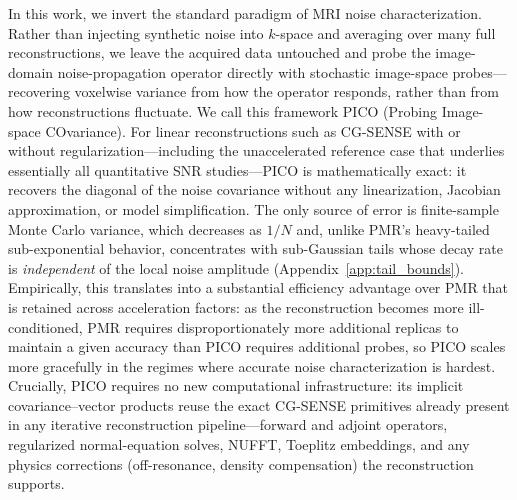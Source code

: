 \documentclass[AMA,STIX2COL,Linenumberson]{MRM}
\begin{document}
In this work, we invert the standard paradigm of MRI 
noise characterization. Rather than injecting synthetic 
noise into $k$-space and averaging over many full 
reconstructions, we leave the acquired data untouched 
and probe the image-domain noise-propagation operator 
directly with stochastic image-space probes---recovering 
voxelwise variance from how the operator responds, 
rather than from how reconstructions fluctuate. We call 
this framework PICO (Probing Image-space COvariance). 
For linear reconstructions such as CG-SENSE with or 
without regularization---including the unaccelerated 
reference case that underlies essentially all 
quantitative SNR studies---PICO is mathematically exact: 
it recovers the diagonal of the noise covariance 
without any linearization, Jacobian approximation, or 
model simplification. The only source of error is 
finite-sample Monte Carlo variance, which decreases as 
$1/N$ and, unlike PMR's heavy-tailed sub-exponential 
behavior, concentrates with sub-Gaussian tails whose 
decay rate is \emph{independent} of the local noise 
amplitude (Appendix~\ref{app:tail_bounds}). Empirically, 
this translates into a substantial efficiency advantage 
over PMR that is retained across acceleration factors: 
as the reconstruction becomes more ill-conditioned, PMR 
requires disproportionately more additional replicas to 
maintain a given accuracy than PICO requires additional 
probes, so PICO scales more gracefully in the regimes 
where accurate noise characterization is hardest. 
Crucially, PICO requires no new computational 
infrastructure: its implicit covariance--vector 
products reuse the exact CG-SENSE primitives already 
present in any iterative reconstruction 
pipeline---forward and adjoint operators, regularized 
normal-equation solves, NUFFT, Toeplitz embeddings, and 
any physics corrections (off-resonance, density 
compensation) the reconstruction supports.
\end{document}
